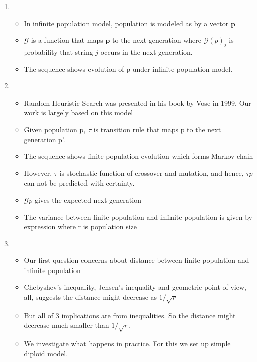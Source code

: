 \documentclass{article}
\begin{document}
\begin{enumerate}
\item
  \begin{itemize}
  \item In infinite population model, population is modeled as by a vector $\bm{p}$
        
  \item $\mathcal{G}$ is a function that maps $\bm{p}$ to the next
    generation where $\mathcal{G}(p)_j$ is probability that string $j$
    occurs in the next generation.
  \item The sequence shows evolution of p under infinite population
    model.
  \end{itemize}
  
\item
  \begin{itemize}
  \item Random Heuristic Search was presented in his book by Vose in 1999. Our work is
    largely based on this model
  \item Given population p, $\tau$ is transition rule that maps p to
    the next generation p'.
  \item The sequence shows finite population evolution which forms
    Markov chain
  \item However, $\tau$ is stochastic function of crossover and
    mutation, and hence, $\tau{p}$ can not be predicted with
    certainty.
  \item $\mathcal{G}{p}$ gives the expected next generation
  \item The variance between finite population and infinite population
    is given by expression where r is population size
  \end{itemize}

\item
  \begin{itemize}
  \item Our first question concerns about distance between finite
    population and infinite population
  \item Chebyshev's inequality, Jensen's inequality and geometric point of view, all, suggests the distance might decrease
    as $1/\sqrt{ r}$
  \item But all of 3 implications are from inequalities. So the distance
    might decrease much smaller than $1/\sqrt{ r}$.
  \item We investigate what happens in practice. For this we set up
    simple diploid model.
  \end{itemize}
    

\end{enumerate}
\end{document}
